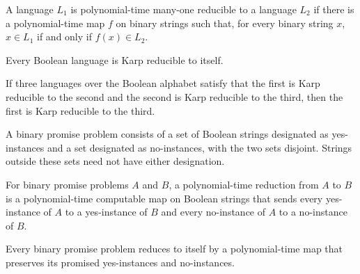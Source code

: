 \begin{definition}
\label{FABL.KarpReducible}
\leanok
{}
A language $L_1$ is polynomial-time many-one reducible to a language $L_2$ if there is a
polynomial-time map $f$ on binary strings such that, for every binary string $x$, $x\in
L_1$ if and only if $f(x)\in L_2$.
\end{definition}

\begin{theorem}
\label{FABL.KarpReducible.refl}
\leanok
{}
Every Boolean language is Karp reducible to itself.
\end{theorem}

\begin{theorem}
\label{FABL.KarpReducible.trans}
\leanok
{}
If three languages over the Boolean alphabet satisfy that the first is Karp reducible to
the second and the second is Karp reducible to the third, then the first is Karp
reducible to the third.
\end{theorem}

\begin{definition}
\label{FABL.BinaryPromiseProblem}
\leanok
A binary promise problem consists of a set of Boolean strings designated as
yes-instances and a set designated as no-instances, with the two sets disjoint. Strings
outside these sets need not have either designation.
\end{definition}

\begin{definition}
\label{FABL.PromiseKarpReducible}
\leanok
{}
For binary promise problems $A$ and $B$, a polynomial-time reduction from $A$ to $B$ is
a polynomial-time computable map on Boolean strings that sends every yes-instance of $A$
to a yes-instance of $B$ and every no-instance of $A$ to a no-instance of $B$.
\end{definition}

\begin{theorem}
\label{FABL.PromiseKarpReducible.refl}
\leanok
{}
Every binary promise problem reduces to itself by a polynomial-time map that preserves
its promised yes-instances and no-instances.
\end{theorem}

